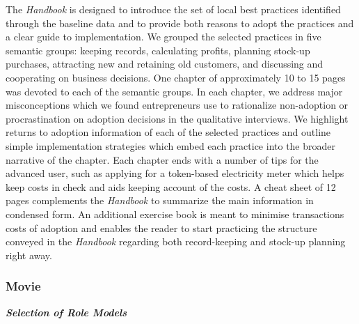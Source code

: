 \documentclass[11.5pt]{article}
\begin{document}
The \emph{Handbook} is designed to introduce the set of local best practices identified through the baseline data and to provide both reasons to adopt the practices and a clear guide to implementation. We grouped the selected practices in five semantic groups: keeping records, calculating profits, planning stock-up purchases, attracting new and retaining old customers, and discussing and cooperating on business decisions. One chapter of approximately 10 to 15 pages was devoted to each of the semantic groups. In each chapter, we address major misconceptions which we found entrepreneurs use to rationalize non-adoption or procrastination on adoption decisions in the qualitative interviews. We highlight returns to adoption information of each of the selected practices and outline simple implementation strategies which embed each practice into the broader narrative of the chapter. %
Each chapter ends with a number of tips for the advanced user, such as applying for a token-based electricity meter which helps keep costs in check and aids keeping account of the costs. %
A cheat sheet of 12 pages complements the \emph{Handbook} to summarize the main information in condensed form. An additional exercise book is meant to minimise transactions costs of adoption and enables the reader to start practicing the structure conveyed in the \emph{Handbook} regarding both record-keeping and stock-up planning right away.

\subsubsection{Movie}

\emph{\textbf{Selection of Role Models}}\
\end{document}
